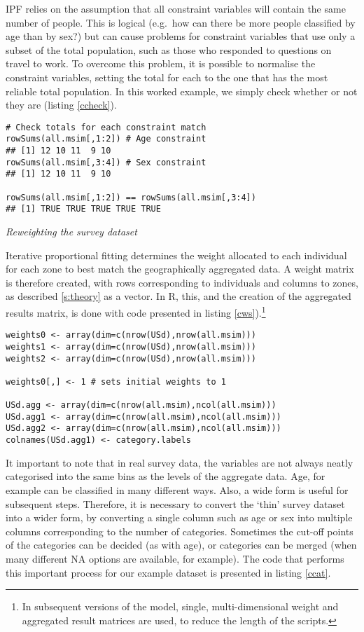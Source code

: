 \documentclass[a4paper,10pt]{article}
\begin{document}
IPF relies on the assumption that all constraint variables will contain the
same number of people. This is logical (e.g.~how can there be more people
classified
by age than by sex?) but can cause problems for constraint variables that use
only a subset of the total population, such as those who responded to questions
on
travel to work. To overcome this problem, it is possible to normalise the
constraint variables, setting the total for each to the one that has the most
reliable total population. In this worked example, we simply check whether
or not they are (listing \ref{ccheck}).

\begin{lstlisting}[float=h, caption={R code to check the constrain populations
match}, label=ccheck]
 # Check totals for each constraint match
rowSums(all.msim[,1:2]) # Age constraint
## [1] 12 10 11  9 10
rowSums(all.msim[,3:4]) # Sex constraint
## [1] 12 10 11  9 10

rowSums(all.msim[,1:2]) == rowSums(all.msim[,3:4])
## [1] TRUE TRUE TRUE TRUE TRUE
\end{lstlisting}

\emph{Reweighting the survey dataset}

Iterative proportional fitting determines the weight allocated to each
individual for each zone to best match the geographically aggregated data.
A weight matrix is therefore created, with rows corresponding to individuals
and columns to zones, as described \cref{s:theory} as a vector. In
R, this, and the creation of the aggregated results matrix,
is done with code presented in listing
\ref{cws}).\footnote{In subsequent
versions of the model, single, multi-dimensional weight and
aggregated result matrices are used,
to reduce the length of the scripts.
}

\begin{lstlisting}[float=h, caption={Creating arrays of weights in R},
label=cws]
weights0 <- array(dim=c(nrow(USd),nrow(all.msim)))
weights1 <- array(dim=c(nrow(USd),nrow(all.msim)))
weights2 <- array(dim=c(nrow(USd),nrow(all.msim)))

weights0[,] <- 1 # sets initial weights to 1

USd.agg <- array(dim=c(nrow(all.msim),ncol(all.msim)))
USd.agg1 <- array(dim=c(nrow(all.msim),ncol(all.msim)))
USd.agg2 <- array(dim=c(nrow(all.msim),ncol(all.msim)))
colnames(USd.agg1) <- category.labels
\end{lstlisting}

It important to note that in real survey data, the variables are not
always neatly categorised into the same bins as the levels of the aggregate
data. Age, for example can be classified in many different ways.
Also, a wide form is useful for subsequent steps.
Therefore, it is necessary to convert the `thin' survey dataset
into a wider form, by converting a single column such as age or sex into
multiple columns corresponding to the number of categories. Sometimes the
cut-off points of the categories can be decided (as with age), or categories
can be merged (when many different NA options are available, for example).
The code that performs this important process for our example dataset is
presented in listing \ref{ccat}.
\end{document}
